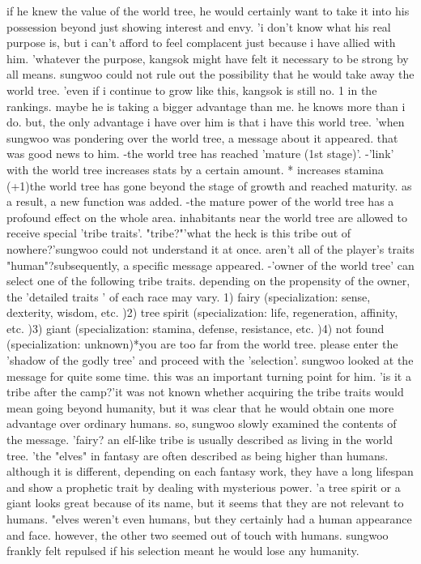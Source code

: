 if he knew the value of the world tree, he would certainly want to take it into his possession beyond just showing interest and envy.
'i don't know what his real purpose is, but i can't afford to feel complacent just because i have allied with him.
'whatever the purpose, kangsok might have felt it necessary to be strong by all means.
 sungwoo could not rule out the possibility that he would take away the world tree.
'even if i continue to grow like this, kangsok is still no.
 1 in the rankings.
 maybe he is taking a bigger advantage than me.
 he knows more than i do.
 but, the only advantage i have over him is that i have this world tree.
'when sungwoo was pondering over the world tree, a message about it appeared.
that was good news to him.
-the world tree has reached 'mature (1st stage)'.
-'link' with the world tree increases stats by a certain amount.
* increases stamina (+1)the world tree has gone beyond the stage of growth and reached maturity.
 as a result, a new function was added.
-the mature power of the world tree has a profound effect on the whole area.
 inhabitants near the world tree are allowed to receive special 'tribe traits'.
"tribe?"'what the heck is this tribe out of nowhere?'sungwoo could not understand it at once.
aren't all of the player's traits "human"?subsequently, a specific message appeared.
-'owner of the world tree' can select one of the following tribe traits.
 depending on the propensity of the owner, the 'detailed traits ' of each race may vary.
1) fairy (specialization: sense, dexterity, wisdom, etc.
)2) tree spirit (specialization: life, regeneration, affinity, etc.
)3) giant (specialization: stamina, defense, resistance, etc.
)4) not found (specialization: unknown)*you are too far from the world tree.
 please enter the 'shadow of the godly tree' and proceed with the 'selection'.
sungwoo looked at the message for quite some time.
 this was an important turning point for him.
'is it a tribe after the camp?'it was not known whether acquiring the tribe traits would mean going beyond humanity, but it was clear that he would obtain one more advantage over ordinary humans.
so, sungwoo slowly examined the contents of the message.
'fairy? an elf-like tribe is usually described as living in the world tree.
'the "elves" in fantasy are often described as being higher than humans.
 although it is different, depending on each fantasy work, they have a long lifespan and show a prophetic trait by dealing with mysterious power.
'a tree spirit or a giant looks great because of its name, but it seems that they are not relevant to humans.
"elves weren't even humans, but they certainly had a human appearance and face.
 however, the other two seemed out of touch with humans.
sungwoo frankly felt repulsed if his selection meant he would lose any humanity.


